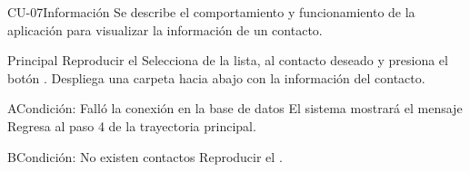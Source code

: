 \begin{UseCase}{CU-07}{Información}{
	Se describe el comportamiento y funcionamiento de la aplicación para visualizar la información de un contacto.
}
	\end{UseCase}
	\begin{UCtrayectoria}{Principal}
		\UCpaso Reproducir el 
		\UCpaso[\UCactor] Selecciona de la lista, al contacto deseado y presiona el botón .  
		\UCpaso[\UCsist] Despliega una carpeta hacia abajo con la información del contacto.
	\end{UCtrayectoria}
	\begin{UCtrayectoriaA}{A}{Condición: Falló la conexión en la base de datos}
		\UCpaso[\UCsist] El sistema mostrará el mensaje 
		\UCpaso[\UCsist] Regresa al paso 4 de la trayectoria principal. 
	\end{UCtrayectoriaA}
	\begin{UCtrayectoriaA}{B}{Condición: No existen contactos}
		\UCpaso[\UCsist] Reproducir el . 
	\end{UCtrayectoriaA}